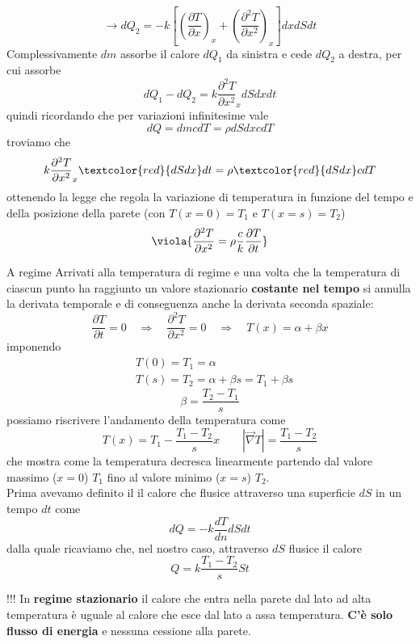 \[ 
\to dQ_2 = -k\left[\left(\frac{\partial T}{\partial x}\right)_x + \left(\frac{\partial^2 T}{\partial x^2}\right)_{x}\right]dxdSdt
\]
Complessivamente \(dm\) assorbe il calore \(dQ_1\) da sinistra e cede \(dQ_2\) a destra, per cui assorbe 
\[ 
dQ_1 - dQ_2  = k\frac{\partial^2 T}{\partial x^2}_{x}dSdx dt
\]
quindi ricordando che per variazioni infinitesime vale
\[ 
dQ = dmcdT = \rho dS dx c dT
\]
troviamo che 
\[ 
k\frac{\partial^2 T}{\partial x^2}_{x}\textcolor{red}{dSdx} dt = \rho  \textcolor{red}{dSdx} c dT
\]
ottenendo la legge che regola la variazione di temperatura in funzione del tempo e della posizione della parete (con \(T(x=0) = T_1\) e \(T(x = s) = T_2\))
\begin{equation}
	\viola{\frac{\partial^2 T}{\partial x^2} = \rho \frac{c}{k} \frac{\partial T}{\partial t}}
\end{equation}
\begin{es}{A regime}
	Arrivati alla temperatura di regime e una volta che la temperatura di ciascun punto ha raggiunto un valore stazionario \textbf{costante nel tempo} si annulla la derivata temporale e di conseguenza anche la derivata seconda spaziale:
	\[ 
	\frac{\partial T}{\partial t} = 0 \quad \Rightarrow \quad \frac{\partial^2 T}{\partial x^2} = 0\quad \Rightarrow \quad T(x) = \alpha + \beta x
	\]
	imponendo
	\begin{align*}
		&T(0) = T_1 = \alpha  \\
		&T(s) = T_2 = \alpha + \beta s = T_1 + \beta s
	\end{align*}
	\[ 
	\beta = \frac{T_2 - T_1}{s} 
	\]
	possiamo riscrivere l'andamento della temperatura come
	\[ 
	T(x) = T_1 - \frac{T_1 - T_2}{s}x \qquad |\overrightarrow{\nabla}T |= \frac{T_1 - T_2}{s}
	\]
	che mostra come la temperatura decresca linearmente partendo dal valore massimo (\(x=0\)) \(T_1\) fino al valore minimo (\(x=s\)) \(T_2\). \\
	
	Prima avevamo definito il il calore che flusice attraverso una superficie \(dS\) in un tempo \(dt\) come
	\[ 
	dQ = -k\frac{dT}{dn}dS dt
	\]
	dalla quale ricaviamo che, nel nostro caso, attraverso \(dS\) flusice il calore 
	\[ 
	Q = k\frac{T_1 - T_2}{s}St
	\]
	\begin{center}
		\colorbox{attenzione}{\begin{minipage}{5in}
				\begin{attenzione}{!!!}
					In \textbf{regime stazionario} il calore che entra nella parete dal lato ad alta temperatura è uguale al calore che esce dal lato a assa temperatura. \textbf{C'è solo flusso di energia} e nessuna cessione alla parete.
				\end{attenzione}
		\end{minipage}}
	\end{center}
\end{es}

